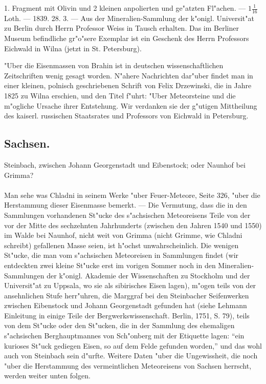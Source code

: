 \documentclass[a4paper, 11pt, oneside, polutonikogreek, german]{article}
\begin{document}
1. Fragment mit Olivin und 2 kleinen anpolierten und ge"atzten Fl"achen. --- $1\frac{1}{16}$ Loth. --- 1839. 28. 3. --- Aus der Mineralien-Sammlung der k"onigl. Universit"at zu Berlin durch Herrn Professor Weiss in Tausch erhalten. Das im Berliner Museum befindliche gr"o"sere Exemplar ist ein Geschenk des Herrn Professors Eichwald in Wilna (jetzt in St. Petersburg).

"Uber die Eisenmassen von Brahin ist in deutschen wissenschaftlichen Zeitschriften wenig gesagt worden. N"ahere Nachrichten dar"uber findet man in einer kleinen, polnisch geschriebenen Schrift von Felix Drzewinski, die in Jahre 1825 zu Wilna erschien, und den Titel f"uhrt: "Uber Meteorsteine und die m"ogliche Ursache ihrer Entstehung. Wir verdanken sie der g"utigen Mittheilung des kaiserl. russischen Staatsrates und Professors von Eichwald in Petersburg.
\subsection{Sachsen.}
\begin{center}
\small
Steinbach, zwischen Johann Georgenstadt und Eibenstock; oder Naunhof bei Grimma?
\end{center}
\paragraph{}
Man sehe was Chladni in seinem Werke "uber Feuer-Meteore, Seite 326, "uber die Herstammung dieser Eisenmasse bemerkt. --- Die Vermutung, dass die in den Sammlungen vorhandenen St"ucke des s"achsischen Meteoreisens Teile von der vor der Mitte des sechzehnten Jahrhunderts (zwischen den Jahren 1540 und 1550) im Walde bei Naunhof, nicht weit von Grimma (nicht Grimme, wie Chladni schreibt) gefallenen Masse seien, ist h"ochst unwahrscheinlich. Die wenigen St"ucke, die man vom s"achsischen Meteoreisen in Sammlungen findet (wir entdeckten zwei kleine St"ucke erst im vorigen Sommer noch in den Mineralien-Sammlungen der k"onigl. Akademie der Wissenschaften zu Stockholm und der Universit"at zu Uppsala, wo sie als sibirisches Eisen lagen), m"ogen teils von der ansehnlichen Stufe herr"uhren, die Marggraf bei den Steinbacher Seifenwerken zwischen Eibenstock und Johann Georgenstadt gefunden hat (siehe Lehmann Einleitung in einige Teile der Bergwerkswissenschaft. Berlin, 1751, S. 79), teils von dem St"ucke oder den St"ucken, die in der Sammlung des ehemaligen s"achsischen Berghauptmannes von Sch"onberg mit der Etiquette lagen: "`ein kurioses St"uck gediegen Eisen, so auf dem Felde gefunden worden,"' und das wohl auch von Steinbach sein d"urfte. Weitere Daten "uber die Ungewissheit, die noch "uber die Herstammung des vermeintlichen Meteoreisens von Sachsen herrscht, werden weiter unten folgen.
\end{document}
